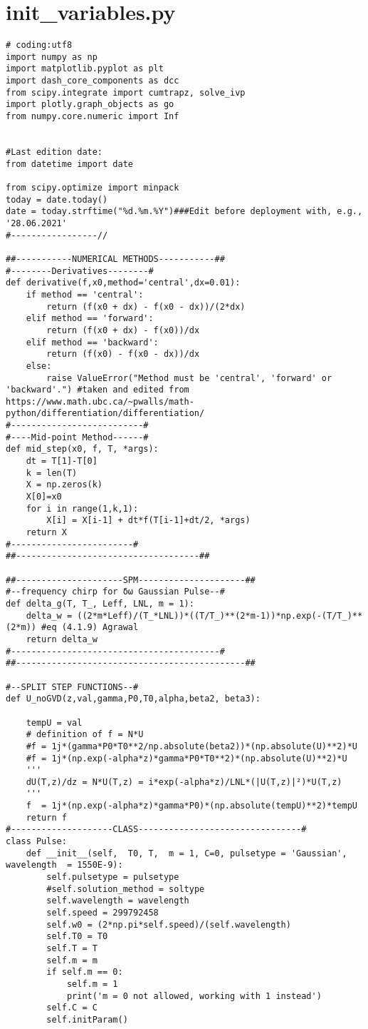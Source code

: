\section{init\_variables.py}
\label{sec:initvariables}


\begin{verbatim}
# coding:utf8
import numpy as np
import matplotlib.pyplot as plt
import dash_core_components as dcc
from scipy.integrate import cumtrapz, solve_ivp
import plotly.graph_objects as go
from numpy.core.numeric import Inf  


#Last edition date:
from datetime import date

from scipy.optimize import minpack
today = date.today()
date = today.strftime("%d.%m.%Y")###Edit before deployment with, e.g., '28.06.2021'
#-----------------//

##-----------NUMERICAL METHODS-----------##
#--------Derivatives--------#
def derivative(f,x0,method='central',dx=0.01):
    if method == 'central':
        return (f(x0 + dx) - f(x0 - dx))/(2*dx)
    elif method == 'forward':
        return (f(x0 + dx) - f(x0))/dx
    elif method == 'backward':
        return (f(x0) - f(x0 - dx))/dx
    else:
        raise ValueError("Method must be 'central', 'forward' or 'backward'.") #taken and edited from https://www.math.ubc.ca/~pwalls/math-python/differentiation/differentiation/
#--------------------------#
#----Mid-point Method------#
def mid_step(x0, f, T, *args):
    dt = T[1]-T[0]
    k = len(T)
    X = np.zeros(k)
    X[0]=x0
    for i in range(1,k,1):
        X[i] = X[i-1] + dt*f(T[i-1]+dt/2, *args)
    return X
#------------------------#
##------------------------------------##

##---------------------SPM---------------------##
#--frequency chirp for δω Gaussian Pulse--#
def delta_g(T, T_, Leff, LNL, m = 1):
    delta_w = ((2*m*Leff)/(T_*LNL))*((T/T_)**(2*m-1))*np.exp(-(T/T_)**(2*m)) #eq (4.1.9) Agrawal
    return delta_w
#-----------------------------------------#
##---------------------------------------------##

#--SPLIT STEP FUNCTIONS--#
def U_noGVD(z,val,gamma,P0,T0,alpha,beta2, beta3): 
    
    tempU = val
    # definition of f = N*U
    #f = 1j*(gamma*P0*T0**2/np.absolute(beta2))*(np.absolute(U)**2)*U
    #f = 1j*(np.exp(-alpha*z)*gamma*P0*T0**2)*(np.absolute(U)**2)*U
    '''
    dU(T,z)/dz = N*U(T,z) = i*exp(-alpha*z)/LNL*(|U(T,z)|²)*U(T,z)
    '''
    f  = 1j*(np.exp(-alpha*z)*gamma*P0)*(np.absolute(tempU)**2)*tempU
    return f
#--------------------CLASS--------------------------------#
class Pulse:
    def __init__(self,  T0, T,  m = 1, C=0, pulsetype = 'Gaussian', wavelength  = 1550E-9):
        self.pulsetype = pulsetype
        #self.solution_method = soltype
        self.wavelength = wavelength
        self.speed = 299792458
        self.w0 = (2*np.pi*self.speed)/(self.wavelength)
        self.T0 = T0
        self.T = T
        self.m = m
        if self.m == 0:
            self.m = 1
            print('m = 0 not allowed, working with 1 instead')
        self.C = C
        self.initParam()
        

\end{verbatim}
